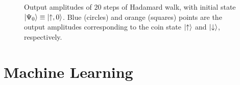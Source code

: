 \begin{figure}[]
    \centering
    \qquad
    \caption{
        Output amplitudes of $20$ steps of Hadamard walk, with initial state $\ket{\Psi_0}\equiv\ket{\uparrow,0}$.
        Blue (circles) and orange (squares) points are the output amplitudes corresponding to the coin state $\ket\uparrow$ and $\ket\downarrow$, respectively.
    }
    \label{fig:hadamardwalk_Nsteps}
\end{figure}

\section{Machine Learning}




